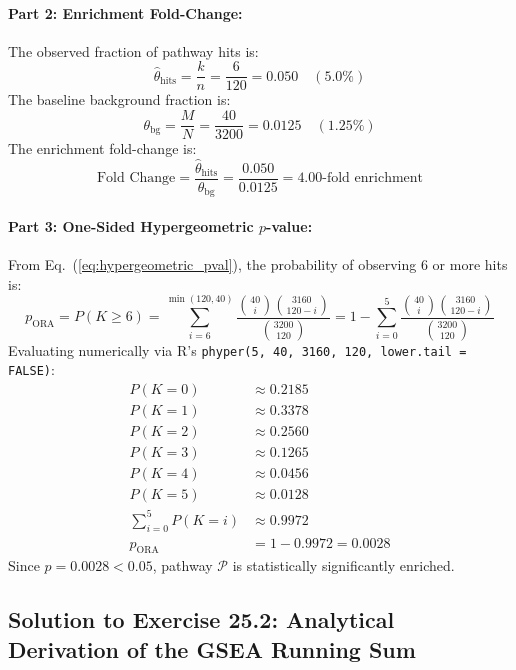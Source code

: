 \documentclass[11pt,twoside,openright]{book}
\begin{document}
\paragraph{Part 2: Enrichment Fold-Change:}
The observed fraction of pathway hits is:
\begin{equation*}
\hat{\theta}_{\text{hits}} = \frac{k}{n} = \frac{6}{120} = 0.050 \quad (5.0\%)
\end{equation*}
The baseline background fraction is:
\begin{equation*}
\theta_{\text{bg}} = \frac{M}{N} = \frac{40}{3200} = 0.0125 \quad (1.25\%)
\end{equation*}
The enrichment fold-change is:
\begin{equation*}
\text{Fold Change} = \frac{\hat{\theta}_{\text{hits}}}{\theta_{\text{bg}}} = \frac{0.050}{0.0125} = 4.00\text{-fold enrichment}
\end{equation*}

\paragraph{Part 3: One-Sided Hypergeometric $p$-value:}
From Eq.~(\ref{eq:hypergeometric_pval}), the probability of observing 6 or more hits is:
\begin{equation*}
p_{\text{ORA}} = P(K \ge 6) = \sum_{i=6}^{\min(120, 40)} \frac{\binom{40}{i} \binom{3160}{120 - i}}{\binom{3200}{120}} = 1 - \sum_{i=0}^5 \frac{\binom{40}{i} \binom{3160}{120 - i}}{\binom{3200}{120}}
\end{equation*}
Evaluating numerically via R's \texttt{phyper(5, 40, 3160, 120, lower.tail = FALSE)}:
\begin{align*}
P(K = 0) &\approx 0.2185 \\
P(K = 1) &\approx 0.3378 \\
P(K = 2) &\approx 0.2560 \\
P(K = 3) &\approx 0.1265 \\
P(K = 4) &\approx 0.0456 \\
P(K = 5) &\approx 0.0128 \\
\sum_{i=0}^5 P(K = i) &\approx 0.9972 \\
p_{\text{ORA}} &= 1 - 0.9972 = 0.0028
\end{align*}
Since $p = 0.0028 < 0.05$, pathway $\mathcal{P}$ is statistically significantly enriched.

\subsection*{Solution to Exercise 25.2: Analytical Derivation of the GSEA Running Sum}
\end{document}
